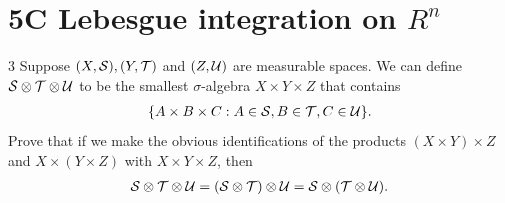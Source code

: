 \section{5C Lebesgue integration on $R^n$}


\begin{exercise}{3}
Suppose $(X, \mathcal{S}), (Y, \mathcal{T})$ and $(Z, \mathcal{U})$ are measurable spaces.
We can define $\mathcal{S} \otimes \mathcal{T} \otimes \mathcal{U}$ to be the smallest $\sigma$-algebra $X \times Y \times Z$ that contains 
\begin{align*}
    \{A \times B \times C: A \in \mathcal{S}, B \in \mathcal{T}, C \in \mathcal{U}\}.
\end{align*}
Prove that if we make the obvious identifications of the products $(X \times Y) \times Z$ and $X \times (Y \times Z)$ with $X \times Y \times Z$, then
\begin{align*}
    \mathcal{S} \otimes \mathcal{T} \otimes \mathcal{U} 
    = (\mathcal{S} \otimes \mathcal{T}) \otimes \mathcal{U} 
    = \mathcal{S} \otimes (\mathcal{T} \otimes \mathcal{U}).
\end{align*}
\end{exercise}
